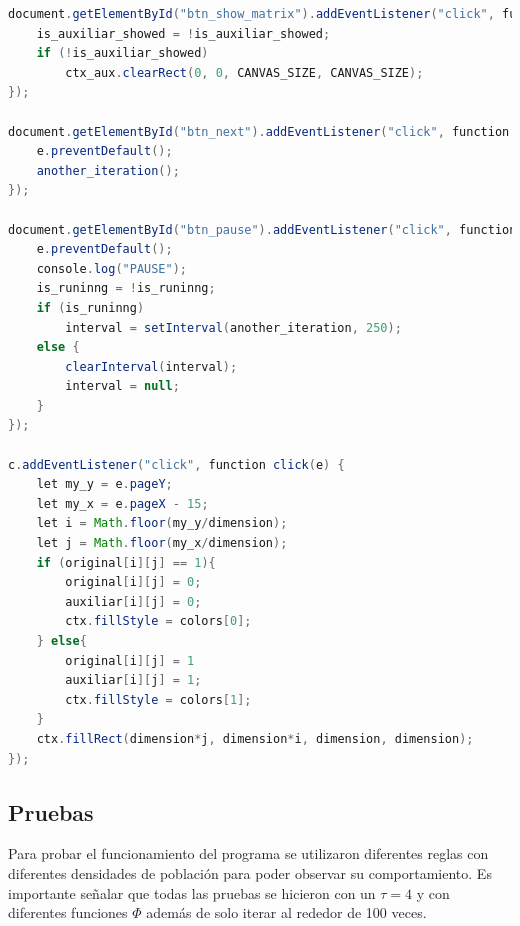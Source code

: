 \documentclass[12pt, titlepage]{article}
\begin{document}
\begin{lstlisting}[language=Java]
document.getElementById("btn_show_matrix").addEventListener("click", function click(e) {
    is_auxiliar_showed = !is_auxiliar_showed;
    if (!is_auxiliar_showed)
        ctx_aux.clearRect(0, 0, CANVAS_SIZE, CANVAS_SIZE);
});

document.getElementById("btn_next").addEventListener("click", function click(e) {
    e.preventDefault();
    another_iteration();
});

document.getElementById("btn_pause").addEventListener("click", function click(e) {
    e.preventDefault();
    console.log("PAUSE");
    is_runinng = !is_runinng;
    if (is_runinng)
        interval = setInterval(another_iteration, 250);
    else {
        clearInterval(interval);
        interval = null;
    }
});

c.addEventListener("click", function click(e) {
    let my_y = e.pageY;
    let my_x = e.pageX - 15;
    let i = Math.floor(my_y/dimension);
    let j = Math.floor(my_x/dimension);
    if (original[i][j] == 1){
        original[i][j] = 0;
        auxiliar[i][j] = 0;
        ctx.fillStyle = colors[0];
    } else{
        original[i][j] = 1
        auxiliar[i][j] = 1;
        ctx.fillStyle = colors[1];
    }
    ctx.fillRect(dimension*j, dimension*i, dimension, dimension);
});
\end{lstlisting}

\subsection{Pruebas}
Para probar el funcionamiento del programa se utilizaron diferentes reglas con diferentes densidades de población para poder observar su comportamiento. Es importante señalar que todas las pruebas se hicieron con un $\tau=4$ y con diferentes funciones $\Phi$ además de solo iterar al rededor de 100 veces.
\end{document}
